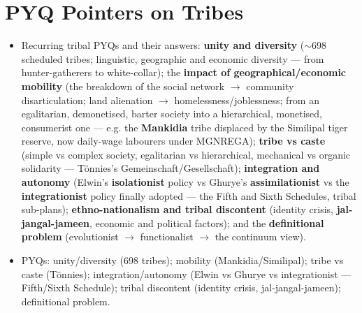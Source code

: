 \section{PYQ Pointers on Tribes}

\begin{KeyConcept}
\begin{itemize}
\item Recurring tribal PYQs and their answers: \textbf{unity and diversity} ($\sim$698 scheduled tribes; linguistic, geographic and economic diversity --- from hunter-gatherers to white-collar); the \textbf{impact of geographical/economic mobility} (the breakdown of the social network $\rightarrow$ community disarticulation; land alienation $\rightarrow$ homelessness/joblessness; from an egalitarian, demonetised, barter society into a hierarchical, monetised, consumerist one --- e.g. the \textbf{Mankidia} tribe displaced by the Similipal tiger reserve, now daily-wage labourers under MGNREGA); \textbf{tribe vs caste} (simple vs complex society, egalitarian vs hierarchical, mechanical vs organic solidarity --- Tönnies's Gemeinschaft/Gesellschaft); \textbf{integration and autonomy} (Elwin's \textbf{isolationist} policy vs Ghurye's \textbf{assimilationist} vs the \textbf{integrationist} policy finally adopted --- the Fifth and Sixth Schedules, tribal sub-plans); \textbf{ethno-nationalism and tribal discontent} (identity crisis, \textbf{jal-jangal-jameen}, economic and political factors); and the \textbf{definitional problem} (evolutionist $\rightarrow$ functionalist $\rightarrow$ the continuum view).
\end{itemize}
\end{KeyConcept}

\begin{QuickRevision}
\begin{itemize}
\item PYQs: unity/diversity (698 tribes); mobility (Mankidia/Similipal); tribe vs caste (Tönnies); integration/autonomy (Elwin vs Ghurye vs integrationist --- Fifth/Sixth Schedule); tribal discontent (identity crisis, jal-jangal-jameen); definitional problem.
\end{itemize}
\end{QuickRevision}
